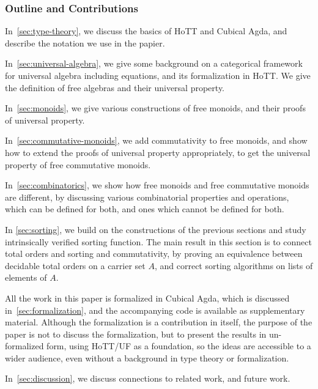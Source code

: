 


\subsubsection*{Outline and Contributions}

\begin{myitemize}
  \item In~\cref{sec:type-theory}, we discuss the basics of HoTT and Cubical Agda, and describe the notation we use in the papier.
  \item In~\cref{sec:universal-algebra}, we give some background on a categorical framework for universal algebra including equations, and its formalization in HoTT. We give the definition of free algebras and their universal property. 
  \item In~\cref{sec:monoids}, we give various constructions of free monoids, and their proofs of universal property.
  \item In~\cref{sec:commutative-monoids}, we add commutativity to free monoids, and show how to extend the proofs of universal property appropriately, to get the universal property of free commutative monoids.
  \item In~\cref{sec:combinatorics}, we show how free monoids and free commutative monoids are different, by discussing various combinatorial properties and operations, which can be defined for both, and ones which cannot be defined for both.
  \item In \cref{sec:sorting}, we build on the constructions of the previous sections and study intrinsically verified sorting function. The main result in this section is to connect total orders and sorting and commutativity, by proving an equivalence between decidable total orders on a carrier set $A$, and correct sorting algorithms on lists of elements of $A$.
  \item All the work in this paper is formalized in Cubical Agda, which is discussed in~\cref{sec:formalization}, and the accompanying code is available as supplementary material. Although the formalization is a contribution in itself, the purpose of the paper is not to discuss the formalization, but to present the results in un-formalized form, using HoTT/UF as a foundation, so the ideas are accessible to a wider audience, even without a background in type theory or formalization.
  \item In~\cref{sec:discussion}, we discuss connections to related work, and future work.
\end{myitemize}
